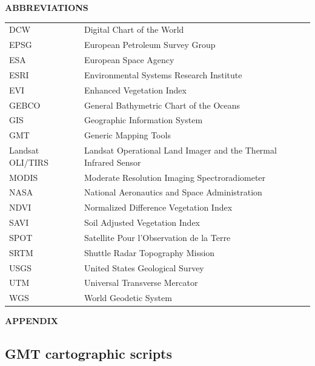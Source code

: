 \documentclass[12pt,a4paper,oneside]{article}
\def \newsection{\vspace{12pt}\textbf}
\begin{document}
\newsection {ABBREVIATIONS}
\vspace{12pt}

\begin{tabular}{@{}ll}
DCW & Digital Chart of the World \\
EPSG & European Petroleum Survey Group \\
ESA & European Space Agency \\
ESRI & Environmental Systems Research Institute \\
EVI & Enhanced Vegetation Index \\
GEBCO & General Bathymetric Chart of the Oceans \\
GIS & Geographic Information System \\
GMT & Generic Mapping Tools \\
Landsat OLI/TIRS & Landsat Operational Land Imager and the Thermal Infrared Sensor \\
MODIS & Moderate Resolution Imaging Spectroradiometer \\
NASA & National Aeronautics and Space Administration \\
NDVI & Normalized Difference Vegetation Index \\
SAVI & Soil Adjusted Vegetation Index \\
SPOT & Satellite Pour l'Observation de la Terre \\
SRTM & Shuttle Radar Topography Mission \\
USGS & United States Geological Survey \\
UTM & Universal Transverse Mercator \\
WGS & World Geodetic System \\
\end{tabular}

\vspace{12pt}

\newsection {APPENDIX}
\vspace{12pt}

\subsection*{GMT cartographic scripts}
\end{document}
